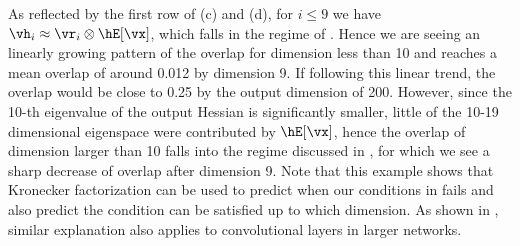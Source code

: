 As reflected by the first row of (c) and (d), for $i\leq 9$ we have $\vh_i\approx \vr_i\otimes\hE[\vx]$, which falls in the regime of . Hence we are seeing an linearly growing pattern of the overlap for dimension less than 10 and reaches a mean overlap of around 0.012 by dimension 9. If following this linear trend, the overlap would be close to 0.25 by the output dimension of 200. However, since the 10-th eigenvalue of the output Hessian is significantly smaller, little of the 10-19 dimensional eigenspace were contributed by $\hE[\vx]$, hence the overlap of dimension larger than 10 falls into the regime discussed in , for which we see a sharp decrease of overlap after dimension 9.
Note that this example shows that Kronecker factorization can be used to predict when our conditions in  fails and also predict the condition can be satisfied up to which dimension. As shown in , similar explanation also applies to convolutional layers in larger networks.



